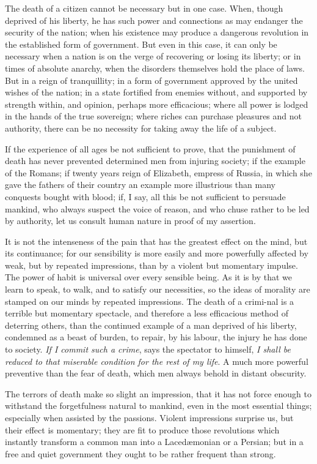 The death of a citizen cannot be necessary but in one case. When,
though deprived of his liberty, he has such power and connections as
may endanger the security of the nation; when his existence may
produce a dangerous revolution in the established form of government.
But even in this case, it can only be necessary when a nation is on
the verge of recovering or losing its liberty; or in times of absolute
anarchy, when the disorders themselves hold the place of laws. But in
a reign of tranquillity; in a form of government approved by the
united wishes of the nation; in a state fortified from enemies
without, and supported by strength within, and opinion, 
perhaps more efficacious; where all power is lodged in the hands of
the true sovereign; where riches can purchase pleasures and not
authority, there can be no necessity for taking away the life of a
subject.

If the experience of all ages be not sufficient to prove, that the
punishment of death has never prevented determined men from injuring
society; if the example of the Romans; if twenty years reign of
Elizabeth, empress of Russia, in which she gave the fathers of their
country an example more illustrious than many conquests bought with
blood; if, I say, all this be not sufficient to persuade mankind, who
always suspect the voice of reason, and who chuse rather to be led by
authority, let us consult human nature in proof of my assertion.

It is not the intenseness of the pain that has the greatest effect on
the mind, but its continuance; for our sensibility is more easily and
more powerfully affected by weak, but by repeated impressions, than by
a violent but momentary impulse. The power of habit is universal over
every sensible being. As it is by that we learn to speak, to walk, and
to satisfy our necessities, so the ideas of morality are stamped on
our minds by repeated impressions. The death of a crimi-nal
is a terrible but momentary spectacle, and therefore a less
efficacious method of deterring others, than the continued example of
a man deprived of his liberty, condemned as a beast of burden, to
repair, by his labour, the injury he has done to society. \textit{If I
commit such a crime}, says the spectator to himself, \textit{I shall
be reduced to that miserable condition for the rest of my life}. A
much more powerful preventive than the fear of death, which men always
behold in distant obscurity.

The terrors of death make so slight an impression, that it has not
force enough to withstand the forgetfulness natural to mankind, even
in the most essential things; especially when assisted by the
passions. Violent impressions surprise us, but their effect is
momentary; they are fit to produce those revolutions which instantly
transform a common man into a Laced\ae monian or a Persian; but in a
free and quiet government they ought to be rather frequent than
strong.

